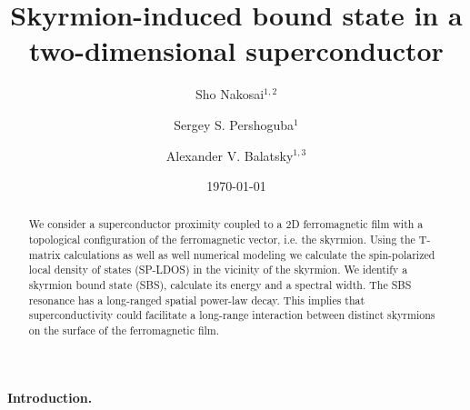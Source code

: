 \documentclass[twocolumn,showpacs,floatfix,nofootinbib,longbibliography]{revtex4-1}
\begin{document}
\title{Skyrmion-induced bound state in a two-dimensional superconductor}

\author{Sho Nakosai$^{1,2}$}
\author{Sergey S. Pershoguba$^{1}$}
\author{Alexander V. Balatsky$^{1,3}$}

\date{\today}


\begin{abstract}
We consider a superconductor proximity coupled to a 2D ferromagnetic film with a topological configuration of the ferromagnetic vector, i.e. the skyrmion. Using the T-matrix calculations as well as well numerical modeling we calculate the spin-polarized local density of states (SP-LDOS) in the vicinity of the skyrmion. We identify a skyrmion bound state (SBS), calculate its energy and a spectral width. The SBS resonance has a long-ranged spatial power-law decay. This implies that superconductivity could facilitate a long-range interaction between distinct skyrmions on the surface of the ferromagnetic film.
\end{abstract}

\pacs{ }   


\maketitle
\paragraph*{Introduction.} \label{sec:intro}
\end{document}
